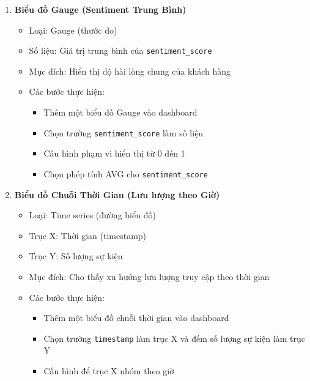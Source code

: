 \begin{enumerate}
    \item \textbf{Biểu đồ Gauge (Sentiment Trung Bình)}
    \begin{itemize}
        \item Loại: Gauge (thước đo)
        \item Số liệu: Giá trị trung bình của \texttt{sentiment\_score}
        \item Mục đích: Hiển thị độ hài lòng chung của khách hàng
        \item Các bước thực hiện:
        \begin{itemize}
            \item Thêm một biểu đồ Gauge vào dashboard
            \item Chọn trường \texttt{sentiment\_score} làm số liệu
            \item Cấu hình phạm vi hiển thị từ 0 đến 1
            \item Chọn phép tính AVG cho \texttt{sentiment\_score} 
        \end{itemize}
        
    \end{itemize}
    \item \textbf{Biểu đồ Chuỗi Thời Gian (Lưu lượng theo Giờ)}
    \begin{itemize}
        \item Loại: Time series (đường biểu đồ)
        \item Trục X: Thời gian (timestamp)
        \item Trục Y: Số lượng sự kiện
        \item Mục đích: Cho thấy xu hướng lưu lượng truy cập theo thời gian
        \item Các bước thực hiện:
        \begin{itemize}
            \item Thêm một biểu đồ  chuỗi thời gian vào dashboard
            \item Chọn trường \texttt{timestamp} làm trục X và đếm số lượng sự kiện làm trục Y
            \item Cấu hình để trục X nhóm theo giờ
        \end{itemize}
    \end{itemize}
    

\end{enumerate}
